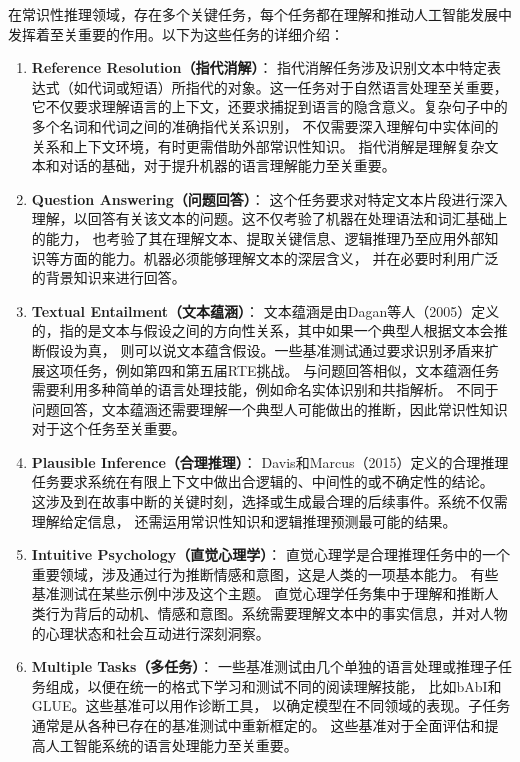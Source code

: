 在常识性推理领域，存在多个关键任务\cite{storks2019recent}，每个任务都在理解和推动人工智能发展中发挥着至关重要的作用。以下为这些任务的详细介绍：
\begin{enumerate}
  \item \textbf{Reference Resolution（指代消解）}：
  指代消解任务涉及识别文本中特定表达式（如代词或短语）所指代的对象。这一任务对于自然语言处理至关重要，它不仅要求理解语言的上下文，还要求捕捉到语言的隐含意义。复杂句子中的多个名词和代词之间的准确指代关系识别，
  不仅需要深入理解句中实体间的关系和上下文环境，有时更需借助外部常识性知识\cite{morgenstern2016planning,davis2017first}。
  指代消解是理解复杂文本和对话的基础，对于提升机器的语言理解能力至关重要。

  \item \textbf{Question Answering（问题回答）}：
  这个任务要求对特定文本片段进行深入理解，以回答有关该文本的问题。这不仅考验了机器在处理语法和词汇基础上的能力，
  也考验了其在理解文本、提取关键信息、逻辑推理乃至应用外部知识等方面的能力。机器必须能够理解文本的深层含义，
  并在必要时利用广泛的背景知识来进行回答。

  \item \textbf{Textual Entailment（文本蕴涵）}：
  文本蕴涵是由Dagan等人（2005）\cite{dagan2005pascal}定义的，指的是文本与假设之间的方向性关系，其中如果一个典型人根据文本会推断假设为真，
  则可以说文本蕴含假设。一些基准测试通过要求识别矛盾来扩展这项任务，例如第四和第五届RTE挑战\cite{giampiccolo2008fourth,bentivogli2009fifth}。
  与问题回答相似，文本蕴涵任务需要利用多种简单的语言处理技能，例如命名实体识别和共指解析。
  不同于问题回答，文本蕴涵还需要理解一个典型人可能做出的推断，因此常识性知识对于这个任务至关重要。

  \item \textbf{Plausible Inference（合理推理）}：
  Davis和Marcus（2015）\cite{davis2015commonsense}定义的合理推理任务要求系统在有限上下文中做出合逻辑的、中间性的或不确定性的结论。
  这涉及到在故事中断的关键时刻，选择或生成最合理的后续事件。系统不仅需理解给定信息，
  还需运用常识性知识和逻辑推理预测最可能的结果。

  \item \textbf{Intuitive Psychology（直觉心理学）}：
  直觉心理学是合理推理任务中的一个重要领域，涉及通过行为推断情感和意图，这是人类的一项基本能力。
  有些基准测试在某些示例中涉及这个主题。%
  直觉心理学任务集中于理解和推断人类行为背后的动机、情感和意图。系统需要理解文本中的事实信息，并对人物的心理状态和社会互动进行深刻洞察。

  \item \textbf{Multiple Tasks（多任务）}：
  一些基准测试由几个单独的语言处理或推理子任务组成，以便在统一的格式下学习和测试不同的阅读理解技能，
  比如bAbI\cite{weston2016towards}和GLUE\cite{wang2018glue}。这些基准可以用作诊断工具，
  以确定模型在不同领域的表现。子任务通常是从各种已存在的基准测试中重新框定的\cite{white2017inference}。
  这些基准对于全面评估和提高人工智能系统的语言处理能力至关重要。
\end{enumerate}


